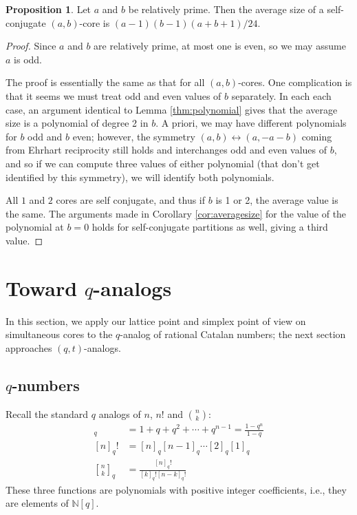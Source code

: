 \documentclass{amsart}[12pt]
\theoremstyle{definition}
\newtheorem{proposition}[dummy]{Proposition}
\newcommand{\N}{\mathbb{N}}
\begin{document}
\begin{proposition} \label{prop:conjugatesize}
Let $a$ and $b$ be relatively prime.  Then the average size of a self-conjugate $(a,b)$-core is $(a-1)(b-1)(a+b+1)/24$.
\end{proposition}


\begin{proof}

Since $a$ and $b$ are relatively prime, at most one is even, so we may assume $a$ is odd.  

The proof is essentially the same as that for all $(a,b)$-cores.  One complication is that it seems we must treat odd and even values of $b$ separately.   In each each case, an argument identical to Lemma \ref{thm:polynomial} gives that the average size is a polynomial of degree 2 in $b$.  A priori, we may have different polynomials for $b$ odd and $b$ even; however, the symmetry $(a,b)\leftrightarrow (a, -a-b)$ coming from Ehrhart reciprocity still holds and interchanges odd and even values of $b$, and so if we can compute three values of either polynomial (that don't get identified by this symmetry), we will identify both polynomials.

All $1$ and $2$ cores are self conjugate, and thus if $b$ is 1 or 2, the average value is the same.  The arguments made in Corollary \ref{cor:averagesize} for the value of the polynomial at $b=0$ holds for self-conjugate partitions as well, giving a third value.
\end{proof}


\section{Toward \texorpdfstring{$q$}{q}-analogs} \label{sec:qcat}
In this section, we apply our lattice point and simplex point of view on simultaneous cores to the $q$-analog of rational Catalan numbers; the next section approaches $(q,t)$-analogs.

\subsection{\texorpdfstring{$q$}{q}-numbers}





Recall the standard $q$ analogs of $n$, $n!$ and $\binom{n}{k}$:
\begin{align*}
[n]_q&=1+q+q^2+\cdots+q^{n-1}=\frac{1-q^n}{1-q} \\
[n]_q!&=[n]_q[n-1]_q\cdots [2]_q[1]_q \\
{n \brack k}_q&=\frac{[n]_q!}{[k]_q![n-k]_q!}
\end{align*}
These three functions are polynomials with positive integer coefficients, i.e., they are elements of $\N[q]$.
\end{document}
